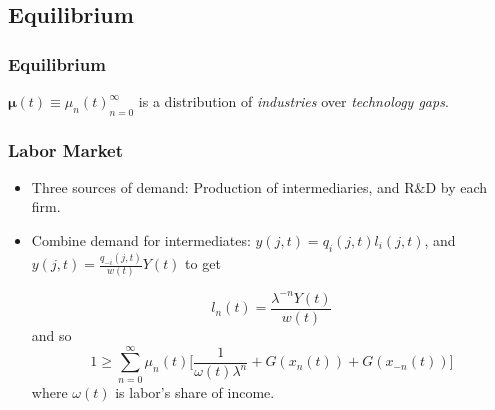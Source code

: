 \documentclass{beamer}
\begin{document}



\subsection{Equilibrium}
\label{sub:equilibrium}
\begin{frame}[t]\frametitle{Equilibrium} 

  $\bm{\mu}(t) \equiv {\mu_n(t)}_{n=0}^\infty$ is a distribution of \emph{industries} over \emph{technology gaps}.
  

\end{frame}

\begin{frame}[t]\frametitle{Labor Market} 
  \begin{itemize}
    \item<+-> Three sources of demand: Production of intermediaries, and R\&D by each firm.
    \item<+-> Combine demand for intermediates: $y(j, t) = q_i(j, t)l_i(j, t)$, and $y(j, t) = \frac{q_{-i}(j, t)}{w(t)}Y(t)$ to get

      \begin{equation*}
        l_n(t) = \frac{\lambda^{-n}Y(t)}{w(t)}
      \end{equation*}
    and so
      \begin{equation*} \label{eq:labor_clearing}
        1 \geq \sum_{n=0}^{\infty} \mu_n(t) \Big[\frac{1}{\omega(t)\lambda^n} + G(x_n(t))    + G(x_{-n}(t))\Big]
      \end{equation*}
      where $\omega(t)$ is labor's share of income.

  \end{itemize}
\end{frame}
\end{document}
